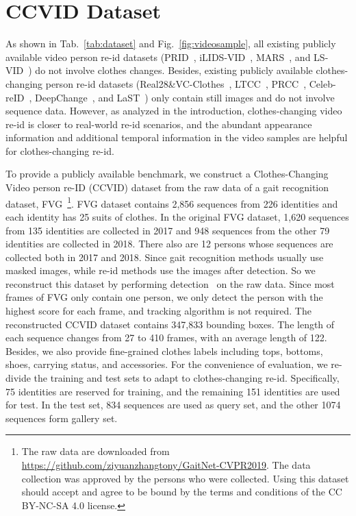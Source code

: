 \documentclass[10pt,twocolumn,letterpaper]{article}
\begin{document}
\section{CCVID Dataset}
As shown in Tab.~\ref{tab:dataset} and Fig.~\ref{fig:videosample}, all existing publicly available video person re-id datasets (\ie PRID~\cite{Hirzer2011PRID}, iLIDS-VID~\cite{Wang2014Person}, MARS~\cite{Zheng2016MARS}, and LS-VID~\cite{Li2019GLTR}) do not involve clothes changes.
Besides, existing publicly available clothes-changing person re-id datasets (\ie Real28\&VC-Clothes~\cite{Real28}, LTCC~\cite{Qian2020LTCC}, PRCC~\cite{Yang2019PRCC}, Celeb-reID~\cite{huang2019beyond}, DeepChange~\cite{DeepChange}, and LaST~\cite{LaST}) only contain still images and do not involve sequence data.
However, as analyzed in the introduction, clothes-changing video re-id is closer to real-world re-id scenarios, and the abundant appearance information and additional temporal information in the video samples are helpful for clothes-changing re-id.

To provide a publicly available benchmark, we construct a Clothes-Changing Video person re-ID (CCVID) dataset from the raw data of a gait recognition dataset, \ie FVG~\cite{Zhang2019Gait}\footnote{The raw data are downloaded from \url{https://github.com/ziyuanzhangtony/GaitNet-CVPR2019}. The data collection was approved by the persons who were collected. Using this dataset should accept and agree to be bound by the terms and conditions of the CC BY-NC-SA 4.0 license.}.
FVG dataset contains 2,856 sequences from 226 identities and each identity has 25 suits of clothes.
In the original FVG dataset, 1,620 sequences from 135 identities are collected in 2017 and 948 sequences from the other 79 identities are collected in 2018.
There also are 12 persons whose sequences are collected both in 2017 and 2018.
Since gait recognition methods usually use masked images, while re-id methods use the images after detection.
So we reconstruct this dataset by performing detection~\cite{He2017MaskRCNN} on the raw data.
Since most frames of FVG only contain one person, we only detect the person with the highest score for each frame, and tracking algorithm is not required.
The reconstructed CCVID dataset contains 347,833 bounding boxes.
The length of each sequence changes from 27 to 410 frames, with an average length of 122. 
Besides, we also provide fine-grained clothes labels including tops, bottoms, shoes, carrying status, and accessories.
For the convenience of evaluation, we re-divide the training and test sets to adapt to clothes-changing re-id.
Specifically, 75 identities are reserved for training, and the remaining 151 identities are used for test.
In the test set, 834 sequences are used as query set, and the other 1074 sequences form gallery set.
\end{document}
